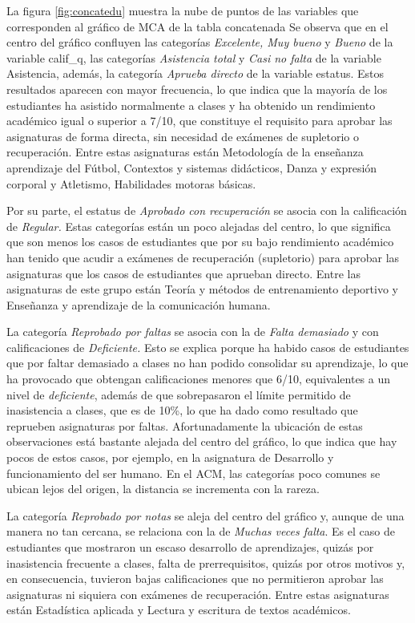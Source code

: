 \documentclass[mathematics,article,submit,moreauthors,pdftex]{mdpi}
\begin{document}
La figura \ref{fig:concatedu} muestra la nube de puntos de las variables
que corresponden al gráfico de MCA de la tabla concatenada Se observa
que en el centro del gráfico confluyen las categorías \emph{Excelente,
Muy bueno} y \emph{Bueno} de la variable calif\_q, las categorías
\emph{Asistencia total} y \emph{Casi no falta }de la variable
Asistencia, además, la categoría \emph{Aprueba directo} de la variable
estatus. Estos resultados aparecen con mayor frecuencia, lo que indica
que la mayoría de los estudiantes ha asistido normalmente a clases y ha
obtenido un rendimiento académico igual o superior a 7/10, que
constituye el requisito para aprobar las asignaturas de forma directa,
sin necesidad de exámenes de supletorio o recuperación. Entre estas
asignaturas están Metodología de la enseñanza aprendizaje del Fútbol,
Contextos y sistemas didácticos, Danza y expresión corporal y Atletismo,
Habilidades motoras básicas.

Por su parte, el estatus de \emph{Aprobado con recuperación} se asocia
con la calificación de \emph{Regular.} Estas categorías están un poco
alejadas del centro, lo que significa que son menos los casos de
estudiantes que por su bajo rendimiento académico han tenido que acudir
a exámenes de recuperación (supletorio) para aprobar las asignaturas que
los casos de estudiantes que aprueban directo. Entre las asignaturas de
este grupo están Teoría y métodos de entrenamiento deportivo y Enseñanza
y aprendizaje de la comunicación humana.

La categoría \emph{Reprobado por faltas} se asocia con la de \emph{Falta
demasiado} y con calificaciones de \emph{Deficiente.} Esto se explica
porque ha habido casos de estudiantes que por faltar demasiado a clases
no han podido consolidar su aprendizaje, lo que ha provocado que
obtengan calificaciones menores que 6/10, equivalentes a un nivel de
\emph{deficiente}, además de que sobrepasaron el límite permitido de
inasistencia a clases, que es de 10\%, lo que ha dado como resultado que
reprueben asignaturas por faltas. Afortunadamente la ubicación de estas
observaciones está bastante alejada del centro del gráfico, lo que
indica que hay pocos de estos casos, por ejemplo, en la asignatura de
Desarrollo y funcionamiento del ser humano. En el ACM, las categorías
poco comunes se ubican lejos del origen, la distancia se incrementa con
la rareza.

La categoría \emph{Reprobado por notas} se aleja del centro del gráfico
y, aunque de una manera no tan cercana, se relaciona con la de
\emph{Muchas veces falta}. Es el caso de estudiantes que mostraron un
escaso desarrollo de aprendizajes, quizás por inasistencia frecuente a
clases, falta de prerrequisitos, quizás por otros motivos y, en
consecuencia, tuvieron bajas calificaciones que no permitieron aprobar
las asignaturas ni siquiera con exámenes de recuperación. Entre estas
asignaturas están Estadística aplicada y Lectura y escritura de textos
académicos.
\end{document}
